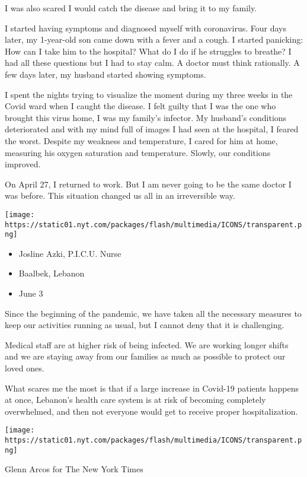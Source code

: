 I was also scared I would catch the disease and bring it to my family.

I started having symptoms and diagnosed myself with coronavirus. Four
days later, my 1-year-old son came down with a fever and a cough. I
started panicking: How can I take him to the hospital? What do I do if
he struggles to breathe? I had all these questions but I had to stay
calm. A doctor must think rationally. A few days later, my husband
started showing symptoms.

I spent the nights trying to visualize the moment during my three weeks
in the Covid ward when I caught the disease. I felt guilty that I was
the one who brought this virus home, I was my family's infector. My
husband's conditions deteriorated and with my mind full of images I had
seen at the hospital, I feared the worst. Despite my weakness and
temperature, I cared for him at home, measuring his oxygen saturation
and temperature. Slowly, our conditions improved.

On April 27, I returned to work. But I am never going to be the same
doctor I was before. This situation changed us all in an irreversible
way.

\texttt{[image: https://static01.nyt.com/packages/flash/multimedia/ICONS/transparent.png]}

\begin{itemize}
\tightlist
\item
  Josline Azki, P.I.C.U. Nurse
\item
  Baalbek, Lebanon
\item
  June 3
\end{itemize}

Since the beginning of the pandemic, we have taken all the necessary
measures to keep our activities running as usual, but I cannot deny that
it is challenging.

Medical staff are at higher risk of being infected. We are working
longer shifts and we are staying away from our families as much as
possible to protect our loved ones.

What scares me the most is that if a large increase in Covid-19 patients
happens at once, Lebanon's health care system is at risk of becoming
completely overwhelmed, and then not everyone would get to receive
proper hospitalization.

\texttt{[image: https://static01.nyt.com/packages/flash/multimedia/ICONS/transparent.png]}

Glenn Arcos for The New York Times


